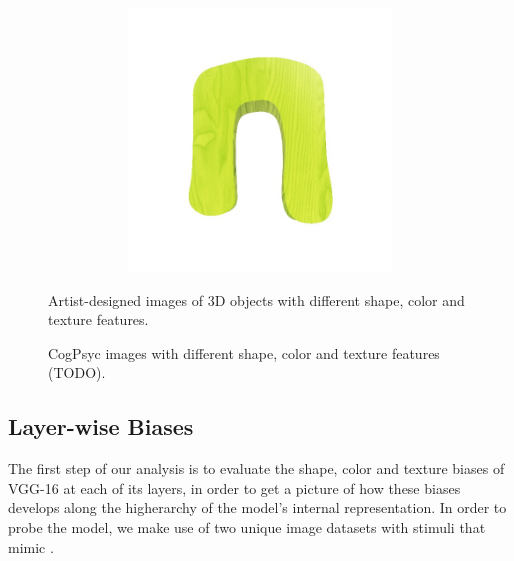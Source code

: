 \begin{figure}[h!]
\begin{center}
\begin{subfigure}[b]{0.15\textwidth}
\begin{center}
\begin{subfigure}[b]{0.9\textwidth}
                \end{subfigure}
                \begin{subfigure}[b]{0.9\textwidth}
                    \includegraphics[width=\linewidth]{figures/artist_objects/fake4_wood_green.jpg}
                \end{subfigure}
            \end{center}
        \end{subfigure}
    \end{center}
    \caption{Artist-designed images of 3D objects with different shape, color and texture features.}
    \label{fig:artist_images}
\end{figure}

\begin{figure}[h!]
    \caption{CogPsyc images with different shape, color and texture features (TODO).}
    \label{fig:cogpsyc_images}
\end{figure}

\subsection{Layer-wise Biases}
The first step of our analysis is to evaluate the shape, color and texture biases of VGG-16
at each of its layers, in order to get a picture of how these biases develops along the
higherarchy of the model's internal representation. In order to probe the model, we make
use of two unique image datasets with stimuli that mimic \cite{Smith2002}.

